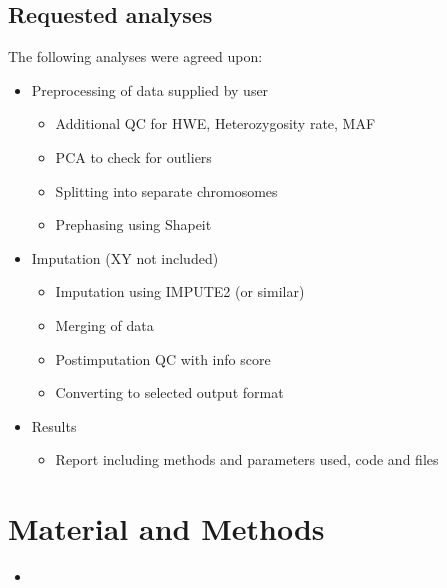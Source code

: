 \documentclass[letterpaper,10pt,english]{sphinxmanual}
\begin{document}
\section{Requested analyses}
\label{\detokenize{content/project_description:requested-analyses}}
The following analyses were agreed upon:
\begin{itemize}
\item {} 
Preprocessing of data supplied by user
\begin{itemize}
\item {} 
Additional QC for HWE, Heterozygosity rate, MAF

\item {} 
PCA to check for outliers

\item {} 
Splitting into separate chromosomes

\item {} 
Pre\sphinxhyphen{}phasing using Shapeit

\end{itemize}

\item {} 
Imputation (XY not included)
\begin{itemize}
\item {} 
Imputation using IMPUTE2 (or similar)

\item {} 
Merging of data

\item {} 
Post\sphinxhyphen{}imputation QC with info score

\item {} 
Converting to selected output format

\end{itemize}

\item {} 
Results
\begin{itemize}
\item {} 
Report including methods and parameters used, code and files

\end{itemize}

\end{itemize}


\chapter{Material and Methods}
\label{\detokenize{content/material_methods:material-and-methods}}\label{\detokenize{content/material_methods::doc}}
\begin{sphinxShadowBox}
\begin{itemize}
\item {} 
\label{\detokenize{content/material_methods:id1}}{\hyperref[\detokenize{content/material_methods:quality-control}]{}}

\end{itemize}
\end{sphinxShadowBox}
\end{document}
